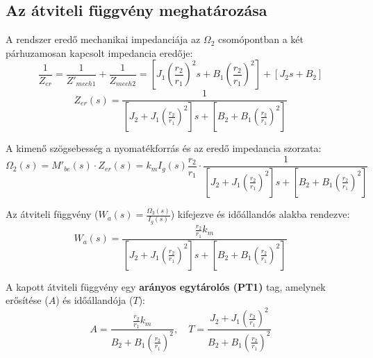 \subsection{Az átviteli függvény meghatározása}
A rendszer eredő mechanikai impedanciája az $\Omega_2$ csomópontban a két párhuzamosan kapcsolt impedancia eredője:
\begin{equation}
	\frac{1}{Z_{er}} = \frac{1}{Z'_{mech1}} + \frac{1}{Z_{mech2}} = \left[ J_1 \left(\frac{r_2}{r_1}\right)^2 s + B_1 \left(\frac{r_2}{r_1}\right)^2 \right] + [J_2 s + B_2]
\end{equation}
\begin{equation}
	Z_{er}(s) = \frac{1}{\left[ J_2 + J_1 \left(\frac{r_2}{r_1}\right)^2 \right] s + \left[ B_2 + B_1 \left(\frac{r_2}{r_1}\right)^2 \right]}
\end{equation}

A kimenő szögsebesség a nyomatékforrás és az eredő impedancia szorzata:
\begin{equation}
	\Omega_2(s) = M'_{be}(s) \cdot Z_{er}(s) = k_m I_g(s) \frac{r_2}{r_1} \cdot \frac{1}{\left[ J_2 + J_1 \left(\frac{r_2}{r_1}\right)^2 \right] s + \left[ B_2 + B_1 \left(\frac{r_2}{r_1}\right)^2 \right]}
\end{equation}

Az átviteli függvény ($W_a(s) = \frac{\Omega_2(s)}{I_g(s)}$) kifejezve és időállandós alakba rendezve:
\begin{equation}
	W_a(s) = \frac{\frac{r_2}{r_1} k_m}{\left[ J_2 + J_1 \left(\frac{r_2}{r_1}\right)^2 \right] s + \left[ B_2 + B_1 \left(\frac{r_2}{r_1}\right)^2 \right]}
\end{equation}

A kapott átviteli függvény egy \textbf{arányos egytárolós (PT1)} tag, amelynek erősítése ($A$) és időállandója ($T$):
\begin{equation}
	A = \frac{\frac{r_2}{r_1} k_m}{B_2 + B_1 \left(\frac{r_2}{r_1}\right)^2}, \quad T = \frac{J_2 + J_1 \left(\frac{r_2}{r_1}\right)^2}{B_2 + B_1 \left(\frac{r_2}{r_1}\right)^2}
\end{equation}
